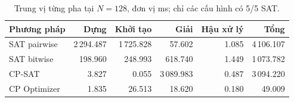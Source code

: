 \begin{table}[htbp]
\caption{Trung vị từng pha tại $N=128$, đơn vị ms; chỉ các cấu hình có 5/5 SAT.}\label{tab:phases}
\centering\small
\begin{tabular}{lrrrrr}
\toprule
Phương pháp & Dựng & Khởi tạo & Giải & Hậu xử lý & Tổng \\
\midrule
SAT pairwise & 2\,294.487 & 1\,725.828 & 57.602 & 1.085 & 4\,106.107 \\
SAT bitwise & 198.960 & 248.993 & 618.740 & 1.449 & 1\,073.782 \\
CP-SAT & 3.827 & 0.055 & 3\,089.983 & 0.487 & 3\,094.220 \\
CP Optimizer & 1.835 & 26.513 & 18.620 & 0.180 & 49.009 \\
\bottomrule
\end{tabular}
\end{table}
